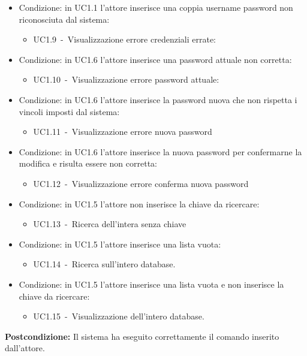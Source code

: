 \documentclass{scalatekids-article}
\begin{document}
\begin{itemize}
\item Condizione: in UC1.1 l'attore inserisce una coppia username password non riconosciuta dal sistema:
  \begin{itemize}
  \item UC1.9\ -\ Visualizzazione errore credenziali errate:
  \end{itemize}
\item Condizione: in UC1.6 l'attore inserisce una password attuale non corretta:
  \begin{itemize}
  \item UC1.10\ -\ Visualizzazione errore password attuale:
  \end{itemize}
\item Condizione: in UC1.6 l'attore inserisce la password nuova che non rispetta i vincoli imposti dal sistema: %
  \begin{itemize}
  \item UC1.11\ -\ Visualizzazione errore nuova password
  \end{itemize}
\item Condizione: in UC1.6 l'attore inserisce la nuova password per confermarne la modifica e risulta essere non corretta: %
  \begin{itemize}
  \item UC1.12\ -\ Visualizzazione errore conferma nuova password
  \end{itemize}
\item Condizione: in UC1.5 l'attore non inserisce la chiave da ricercare:
  \begin{itemize}
    \item UC1.13\ -\ Ricerca dell'intera  senza chiave
  \end{itemize}
\item Condizione: in UC1.5 l'attore inserisce una lista  vuota:
  \begin{itemize}
    \item UC1.14\ -\ Ricerca sull'intero database.
  \end{itemize}
\item Condizione: in UC1.5 l'attore inserisce una lista  vuota e non inserisce la chiave da ricercare:
  \begin{itemize}
    \item UC1.15\ -\ Visualizzazione dell'intero database.
  \end{itemize}
\end{itemize}
\textbf{Postcondizione:} Il sistema ha eseguito correttamente il comando inserito dall'attore.
\end{document}

